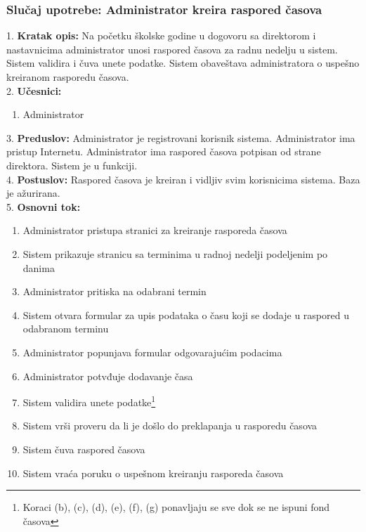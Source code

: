 \documentclass{article}
\begin{document}
\subsubsection{Slučaj upotrebe: Administrator kreira raspored časova}
1. \textbf{Kratak opis:} Na početku školske godine u dogovoru sa direktorom i nastavnicima administrator unosi raspored časova za radnu nedelju u sistem. Sistem validira i čuva unete podatke. Sistem obaveštava administratora o uspešno kreiranom rasporedu časova. \\ 

2. \textbf{Učesnici:}
\begin{enumerate} [label=(\alph*)]
\item Administrator
\end{enumerate} 

3. \textbf{Preduslov:} Administrator je registrovani korisnik sistema. Administrator ima pristup Internetu. Administrator ima raspored časova potpisan od strane direktora. Sistem je u funkciji. \\

4. \textbf{Postuslov:} Raspored časova je kreiran i vidljiv svim korisnicima sistema. Baza je ažurirana. \\

5. \textbf{Osnovni tok:} 
\begin{enumerate} [label=(\alph*)]
\item Administrator pristupa stranici za kreiranje rasporeda časova
\item Sistem prikazuje stranicu sa terminima u radnoj nedelji podeljenim po danima
\item Administrator pritiska na odabrani termin
\item Sistem otvara formular za upis podataka o času koji se dodaje u raspored u odabranom terminu
\item Administrator popunjava formular odgovarajućim podacima
\item Administrator potvđuje dodavanje časa 
\item Sistem validira unete podatke\footnote{Koraci (b), (c), (d), (e), (f), (g) ponavljaju se sve dok se ne ispuni fond časova}
\item Sistem vrši proveru da li je došlo do preklapanja u rasporedu časova
\item Sistem čuva raspored časova
\item Sistem vraća poruku o uspešnom kreiranju rasporeda časova
\end{enumerate}
\end{document}
